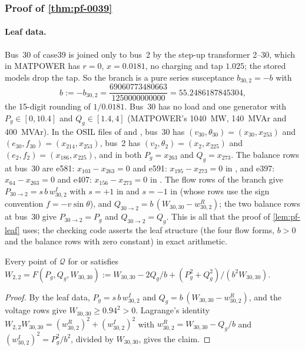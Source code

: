 \subsubsection{Proof of \texorpdfstring{\cref{thm:pf-0039}}{the 39-bus theorem}}\label{app:powerflow-0039}

\paragraph{Leaf data.}
Bus~30 of case39 is joined only to bus~2 by the step-up transformer 2--30, which in MATPOWER has $r=0$, $x=0.0181$, no charging and tap $1.025$; the stored models drop the tap.
So the branch is a pure series susceptance $b_{30,2}=-b$ with
\[
b:=-b_{30,2}=\frac{69060773480663}{1250000000000}=55.2486187845304,
\]
the 15-digit rounding of $1/0.0181$.
Bus~30 has no load and one generator with $P_g\in[0,10.4]$ and $Q_g\in[1.4,4]$ (MATPOWER's 1040~MW, 140~MVAr and 400~MVAr).
In the OSIL files of  and , bus~30 has $(v_{30},\theta_{30})=(x_{30},x_{253})$ and $(e_{30},f_{30})=(x_{214},x_{253})$, bus~2 has $(v_2,\theta_2)=(x_2,x_{225})$ and $(e_2,f_2)=(x_{186},x_{225})$, and in both $P_g=x_{263}$ and $Q_g=x_{273}$.
The balance rows at bus~30 are e581: $x_{103}-x_{263}=0$ and e591: $x_{195}-x_{273}=0$ in , and e397: $x_{64}-x_{263}=0$ and e407: $x_{156}-x_{273}=0$ in .
The flow rows of the branch give $P_{30\to2}=s\,b\,w^I_{30,2}$ with $s=+1$ in  and $s=-1$ in  (whose rows use the sign convention $f=-v\sin\theta$), and $Q_{30\to2}=b\,(W_{30,30}-w^R_{30,2})$;
the two balance rows at bus~30 give $P_{30\to2}=P_g$ and $Q_{30\to2}=Q_g$.
This is all that the proof of \cref{lem:pf-leaf} uses; the checking code asserts the leaf structure (the four flow forms, $b>0$ and the balance rows with zero constant) in exact arithmetic.

\begin{lemma}\label{lem:pf-leaf}
Every point of $\mathcal Q$ for  or  satisfies
$W_{2,2}=F(P_g,Q_g,W_{30,30}):=W_{30,30}-2Q_g/b+(P_g^2+Q_g^2)/(b^2W_{30,30})$.
\end{lemma}

\begin{proof}
By the leaf data, $P_g=s\,b\,w^I_{30,2}$ and $Q_g=b\,(W_{30,30}-w^R_{30,2})$, and the voltage rows give $W_{30,30}\ge0.94^2>0$.
Lagrange's identity $W_{2,2}W_{30,30}=(w^R_{30,2})^2+(w^I_{30,2})^2$ with $w^R_{30,2}=W_{30,30}-Q_g/b$ and $(w^I_{30,2})^2=P_g^2/b^2$, divided by $W_{30,30}$, gives the claim.
\end{proof}

